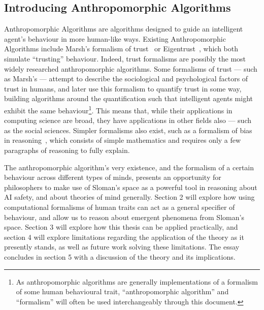 \subsection{Introducing Anthropomorphic Algorithms}
Anthropomorphic Algorithms are algorithms designed to guide an intelligent agent's behaviour in more human-like ways. Existing Anthropomorphic Algorithms include Marsh's formalism of trust~\citep{Marsh1994FormalisingConcept} or Eigentrust~\citep{eigentrust}, which both simulate ``trusting'' behaviour. Indeed, trust formalisms are possibly the most widely researched anthropomorphic algorithms. Some formalisms of trust --- such as Marsh's --- attempt to describe the sociological and psychological factors of trust in humans, and later use this formalism to quantify trust in some way, building algorithms around the quantification such that intelligent agents might exhibit the same behaviour\footnote{As anthropomorphic algorithms are generally implementations of a formalism of some human behavioural trait, ``anthropomorphic algorithm'' and ``formalism'' will often be used interchangeably through this document.}. This means that, while their applications in computing science are broad, they have applications in other fields also --- such as the social sciences. Simpler formalisms also exist, such as a formalism of bias in reasoning~\cite{armstrong_bias}, which consists of simple mathematics and requires only a few paragraphs of reasoning to fully explain.\par

The anthropomorphic algorithm's very existence, and the formalism of a certain behaviour across different types of minds, presents an opportunity for philosophers to make use of Sloman's space as a powerful tool in reasoning about AI safety, and about theories of mind generally. Section 2 will explore how using computational formalisms of human traits can act as a general specifier of behaviour, and allow us to reason about emergent phenomena from Sloman's space. Section 3 will explore how this thesis can be applied practically, and section 4 will explore limitations regarding the application of the theory as it presently stands, as well as future work solving these limitations. The essay concludes in section 5 with a discussion of the theory and its implications.\par
